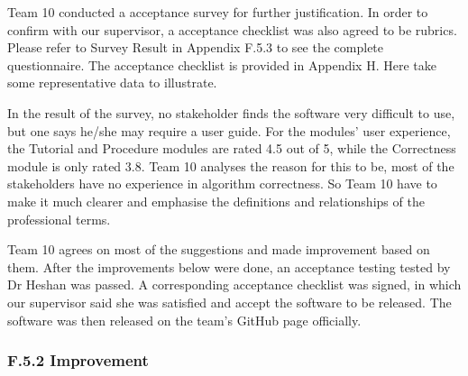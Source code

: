 \documentclass[
]{article}
\begin{document}
Team 10 conducted a acceptance survey for further justification. In
order to confirm with our supervisor, a acceptance checklist was also
agreed to be rubrics. Please refer to Survey Result in Appendix F.5.3 to
see the complete questionnaire. The acceptance checklist is provided in
Appendix H. Here take some representative data to illustrate.

In the result of the survey, no stakeholder finds the software very
difficult to use, but one says he/she may require a user guide. For the
modules' user experience, the Tutorial and Procedure modules are rated
4.5 out of 5, while the Correctness module is only rated 3.8. Team 10
analyses the reason for this to be, most of the stakeholders have no
experience in algorithm correctness. So Team 10 have to make it much
clearer and emphasise the definitions and relationships of the
professional terms.

Team 10 agrees on most of the suggestions and made improvement based on
them. After the improvements below were done, an acceptance testing
tested by Dr Heshan was passed. A corresponding acceptance checklist was
signed, in which our supervisor said she was satisfied and accept the
software to be released. The software was then released on the team's
GitHub page officially.

\hypertarget{header-n208}{%
\subsubsection{F.5.2 Improvement}\label{header-n208}}
\end{document}
